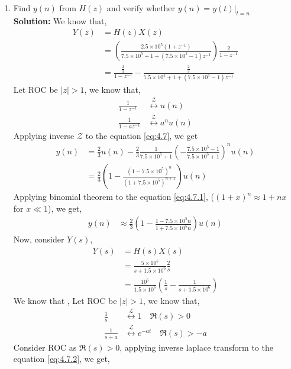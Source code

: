 \documentclass[journal,12pt,twocolumn]{IEEEtran}
\newcommand{\solution}{\noindent \textbf{Solution: }}
\providecommand{\brak}[1]{\ensuremath{\left(#1\right)}}
\providecommand{\abs}[1]{\left\vert#1\right\vert}
\providecommand{\system}[1]{\overset{\mathcal{#1}}{ \longleftrightarrow}}
\numberwithin{equation}{section}
\renewcommand\thesection{\arabic{section}}
\begin{document}
\begin{enumerate}[label=\thesection.\arabic*.,ref=\thesection.\theenumi]
\item Find $y(n)$ from $H(z)$ and verify whether $y(n) = y(t)|_{t=n}$\\
\solution 
We know that, 
\begin{align}
	Y(z) &= H(z)X(z) \\
	&= \brak{\frac{2.5\times10^5 (1+z^{-1})}{7.5\times10^5 + 1 + (7.5\times10^5 - 1)z^{-1}}} \frac{2}{1-z^{-1}} \\
	\label{eq:4.7}
	&= \frac{\frac{2}{3}}{1-z^{-1}} -\frac{\frac{2}{3}}{7.5\times10^5 + 1 + (7.5\times10^5 - 1)z^{-1}}
\end{align}
Let ROC be $\abs{z}>1$, we know that,
\begin{align}
	\frac{1}{1-z^{-1}} &\system{Z} u(n)\\
	\frac{1}{1-a z^{-1}} &\system{Z} a^{n} u(n)
\end{align}
Applying inverse $\mathcal{Z}$ to the equation \eqref{eq:4.7}, we get 
\begin{align}
	y(n) &= \frac{2}{3}u(n) - \frac{2}{3}\frac{1}{7.5\times10^5 + 1}\brak{-\frac{7.5\times10^5 - 1}{7.5\times10^5 + 1}}^nu(n) \\
\label{eq:4.7.1}
	&= \frac{2}{3} \brak{1 - \frac{(1-7.5\times10^5)^n}{(1+7.5\times10^5)^{n+1}}}u(n)
\end{align}
Applying binomial theorem to the equation \eqref{eq:4.7.1}, ($(1+x)^{n} \approx 1+nx$ for $x \ll 1$), we get,
\begin{align}
	\label{eq:4.7.3}
	y(n) &\approx \frac{2}{3} \brak{1 - \frac{1-7.5\times10^5n}{1+7.5\times10^5n}}u(n)
\end{align}
Now, consider $Y(s)$, 
\begin{align}
	Y(s) &= H(s)X(s) \\
	&= \frac{5\times10^5}{s+1.5\times10^6} \frac{2}{s} \\
	\label{eq:4.7.2}
	&= \frac{10^6}{1.5\times10^6} \brak{\frac{1}{s} - \frac{1}{s+1.5\times10^6}}
\end{align}
We know that ,
Let ROC be $\abs{z}>1$, we know that,
\begin{align}
	\frac{1}{s} &\system{L} 1 \quad  \Re(s)>0\\
	\frac{1}{s+a} &\system{L} e^{-at} \quad \Re(s)>-a
\end{align}
Consider ROC as $\Re(s)>0$, applying inverse laplace transform to the equation \eqref{eq:4.7.2}, we get,  
\begin{align}

\end{align}
\end{enumerate}
\end{document}
